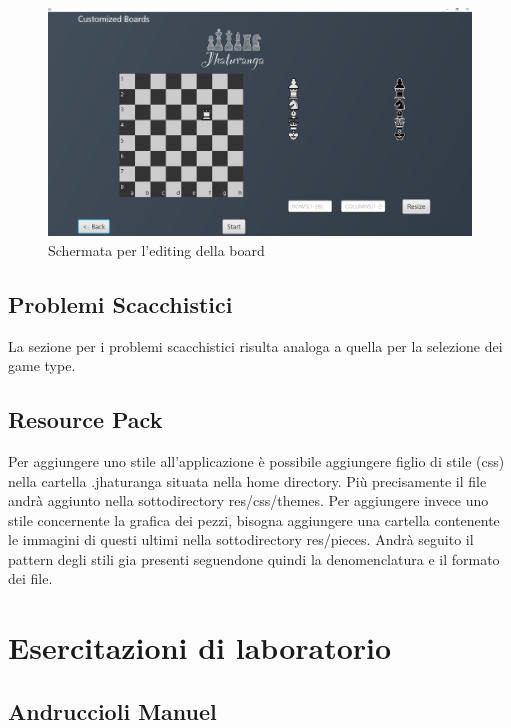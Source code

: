 \documentclass[a4paper,12pt]{report}
\begin{document}
\begin{figure}[H]
    \begin{center}
        \centering
        \includegraphics[scale=0.25]{img/guidaUtente/editorBoard.png}
    \end{center}
    \caption{Schermata per l'editing della board}
    \label{img:editorBoard}
\end{figure}

\section{Problemi Scacchistici}
La sezione per i problemi scacchistici risulta analoga a quella per la selezione dei game type.

\section{Resource Pack}
Per aggiungere uno stile all'applicazione è possibile aggiungere figlio di stile (css) nella cartella .jhaturanga situata nella home directory. Più precisamente il file andrà aggiunto nella sottodirectory res/css/themes.
Per aggiungere invece uno stile concernente la grafica dei pezzi, bisogna aggiungere una cartella contenente le immagini di questi ultimi nella sottodirectory res/pieces.
Andrà seguito il pattern degli stili gia presenti seguendone quindi la denomenclatura e il formato dei file.

\chapter{Esercitazioni di laboratorio}

\section{Andruccioli Manuel}
\end{document}
